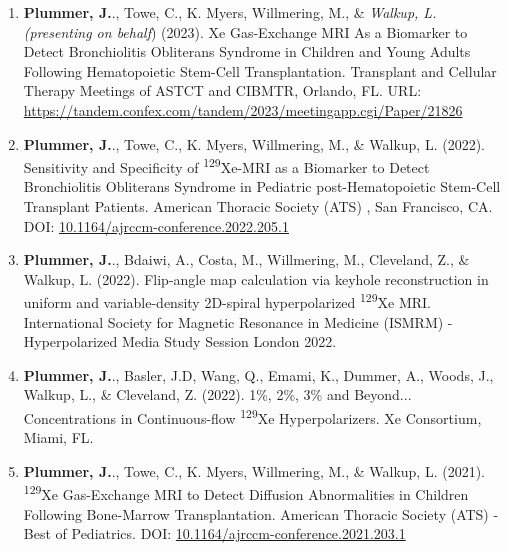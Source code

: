\documentclass[12pt,]{scrartcl}
\begin{document}
\begin{enumerate}
  \leftskip-0.13in %
  \item \textbf{Plummer, J.}., Towe, C., K. Myers, Willmering, M., \&  \textit{Walkup, L. (presenting on behalf}) (2023). Xe Gas-Exchange MRI As a Biomarker to Detect Bronchiolitis Obliterans Syndrome in Children and Young Adults Following Hematopoietic Stem-Cell Transplantation. Transplant and Cellular Therapy Meetings of ASTCT and CIBMTR, Orlando, FL. URL: \href{https://tandem.confex.com/tandem/2023/meetingapp.cgi/Paper/21826}{https://tandem.confex.com/tandem/2023/meetingapp.cgi/Paper/21826}
  
  \item \textbf{Plummer, J.}., Towe, C., K. Myers, Willmering, M., \& Walkup, L. (2022). Sensitivity and Specificity of \textsuperscript{129}Xe-MRI as a Biomarker to Detect Bronchiolitis Obliterans Syndrome in Pediatric post-Hematopoietic Stem-Cell Transplant Patients. American Thoracic Society (ATS) , San Francisco, CA. DOI: \href{https://www.atsjournals.org/doi/abs/10.1164/ajrccm-conference.2022.205.1_MeetingAbstracts.A2181}{10.1164/ajrccm-conference.2022.205.1}
  
  \item \textbf{Plummer, J.}., Bdaiwi, A., Costa, M., Willmering, M., Cleveland, Z., \& Walkup, L. (2022). Flip-angle map calculation via keyhole reconstruction in uniform and variable-density 2D-spiral hyperpolarized \textsuperscript{129}Xe MRI. International Society for Magnetic Resonance in Medicine (ISMRM) - Hyperpolarized Media Study Session London 2022.
  
  \item \textbf{Plummer, J.}., Basler, J.D, Wang, Q., Emami, K., Dummer, A., Woods, J., Walkup, L., \& Cleveland, Z. (2022). 1\%, 2\%, 3\% and Beyond... Concentrations in Continuous-flow \textsuperscript{129}Xe Hyperpolarizers. Xe Consortium, Miami, FL.
  
  \item \textbf{Plummer, J.}., Towe, C., K. Myers, Willmering, M., \& Walkup, L. (2021). \textsuperscript{129}Xe Gas-Exchange MRI to Detect Diffusion Abnormalities in Children Following Bone-Marrow Transplantation. American Thoracic Society (ATS) - Best of Pediatrics. DOI: \href{http://dx.doi.org/10.1164/ajrccm-conference.2021.203.1_MeetingAbstracts.A1166}{10.1164/ajrccm-conference.2021.203.1}
  
  
\end{enumerate}
\end{document}
